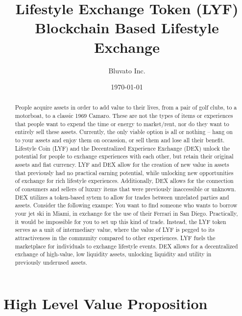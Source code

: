 \documentclass[11pt]{article}
\begin{document}
\title{%
Lifestyle Exchange Token (LYF) \\[1mm] 
\large Blockchain Based Lifestyle Exchange}
\author{Bluvato Inc.}
\date{\today}
\maketitle


\begin{abstract}
People acquire assets in order to add value to their lives, from a pair of golf clubs, to a motorboat, to a classic 1969 Camaro. These are not the types of items or experiences that people want to expend the time or energy to market/rent, nor do they want to entirely sell these assets. Currently, the only viable option is all or nothing -- hang on to your assets and enjoy them on occassion, or sell them and lose all their benefit. Lifestyle Coin (LYF) and the Decentralized Experience Exchange (DEX) unlock the potential for people to exchange experiences with each other, but retain their original assets and fiat currency. LYF and DEX allow for the creation of new value in assets that previously had no practical earning potential, while unlocking new opportunities of exchange for rich lifestyle experiences. Additionally, DEX allows for the connection of consumers and sellers of luxury items that were previously inaccessible or unknown. DEX utilizes a token-based sytem to allow for trades between unrelated parties and assets. Consider the following exampe: You want to find someone who wants to borrow your jet ski in Miami, in exchange for the use of their Ferrari in San Diego. Practically, it would be impossible for you to set up this kind of trade. Instead, the LYF token serves as a unit of intermediary value, where the value of LYF is pegged to its attractiveness in the community compared to other experiences. LYF fuels the marketplace for individuals to exchange lifestyle events. DEX allows for a decentralized exchange of high-value, low liquidity assets, unlocking liquidity and utility in previously underused assets.

\end{abstract}
\pagebreak

\tableofcontents
\newpage

\section{High Level Value Proposition}
\label{sec-2}
\end{document}
